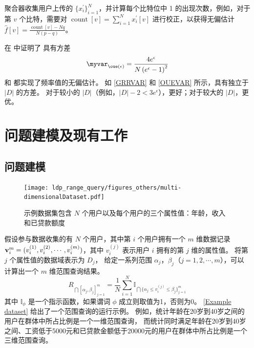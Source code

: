 聚合器收集用户上传的 $\{x_i^{\prime}\}_{i=1}^{N}$，并计算每个比特位中 1 的出现次数，例如，对于第 $v$ 个比特，需要对 $\operatorname{count}[v] = \sum_{i = 1}^{N} x_i^{\prime}[v]$ 进行校正，以获得无偏估计 $\hat{f}[v] = \frac{\operatorname{count}[v] - Nq}{N(p - q)}$。

在 \cite{wang2017locally} 中证明了 \oue 具有方差
\begin{equation}
\myvar_{\oue(\epsilon)} = \frac{4e^{\epsilon}}{N\left(e^{\epsilon}-1\right)^{2}}
\label{OUEVAR}
\end{equation}
\grr 和 \oue 都实现了频率值的无偏估计。
如 \autoref{GRRVAR} 和 \autoref{OUEVAR} 所示，\oue 具有独立于 $|D|$ 的方差。
对于较小的 $|D|$（例如，$|D|-2<3e^\epsilon$），\grr 更好；对于较大的 $|D|$，\oue 更优。


\section{问题建模及现有工作}
\subsection{问题建模}
\begin{figure}[h]
    \centering
    \texttt{[image: ldp\_range\_query/figures\_others/multi-dimensionalDataset.pdf]}
    \vspace{-0.2cm}
    \caption{示例数据集包含 $N$ 个用户以及每个用户的三个属性值：年龄，收入和已贷款额度} 
    \label{Example dataset}
    \vspace{-0.3cm}
\end{figure}

假设参与数据收集的有 $N$ 个用户，其中第 $i$ 个用户拥有一个 $m$ 维数据记录 ${\bf{v}}^{m}_i = (v^{(1)}_i, v^{(2)}_i, \cdots, v^{(m)}_i)$，其中 $v_i^{(j)}$ 表示用户 $i$ 拥有的第 $j$ 维的属性值。
将第 $j$ 个属性值的数据域表示为 $D_j$，
给定一系列范围 $\alpha_j$，$\beta_j$（$j=1,2,\cdots,m$），可以计算出一个 $m$ 维范围查询结果。
\begin{equation}
    R_{\bigcap {[\alpha_j,\beta_j]}_{j=1}^{m}}=\frac{1}{N} \sum_{i=1}^{N} \mathbb{I}_{\bigcap{\{\alpha_j \leq v_i^{(j)} \leq \beta_j\}_{j=1}^{m}}}
\end{equation}
其中 $\mathbb{I}_\phi$ 是一个指示函数，如果谓词 $\phi$ 成立则取值为1，否则为0。
\autoref{Example dataset} 给出了一个范围查询的运行示例。
例如，统计年龄在20岁到40岁之间的用户在群体中所占比例是一个一维范围查询，
而统计同时满足年龄在20岁到40岁之间、工资低于5000元和已贷款金额低于20000元的用户在群体中所占比例是一个三维范围查询。

